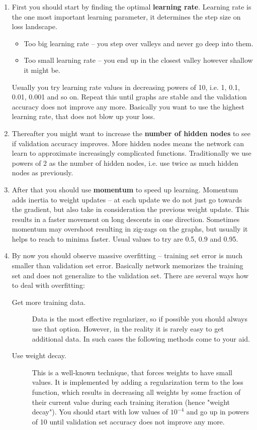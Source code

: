 \documentclass[a4paper,11pt]{article}
\begin{document}
\begin{enumerate}
	\item First you should start by finding the optimal \textbf{learning rate}. Learning rate is the one most important learning parameter, it determines the step size on loss landscape. 
	\begin{itemize}	
		\item Too big learning rate -- you step over valleys and never go deep into them. 
		\item Too small learning rate -- you end up in the closest valley however shallow it might be. 
	\end{itemize}
	Usually you try learning rate values in decreasing powers of 10, i.e. 1, 0.1, 0.01, 0.001 and so on. Repeat this until graphs are stable and the validation accuracy does not improve any more. Basically you want to use the highest learning rate, that does not blow up your loss.
	\item Thereafter you might want to increase the \textbf{number of hidden nodes} to see if validation accuracy improves. More hidden nodes means the network can learn to approximate increasingly complicated functions. Traditionally we use powers of 2 as the number of hidden nodes, i.e. use twice as much hidden nodes as previously.
	\item After that you should use \textbf{momentum} to speed up learning. Momentum adds inertia to weight updates -- at each update we do not just go towards the gradient, but also take in consideration the previous weight update. This results in a faster movement on long descents in one direction. Sometimes momentum may overshoot resulting in zig-zags on the graphs, but usually it helps to reach to minima faster. Usual values to try are 0.5, 0.9 and 0.95.
	\item By now you should observe massive overfitting -- training set error is much smaller than validation set error. Basically network memorizes the training set and does not generalize to the validation set. There are several ways how to deal with overfitting:
	\begin{description}
		\item[Get more training data.] Data is the most effective regularizer, so if possible you should always use that option. However, in the reality it is rarely easy to get additional data. In such cases the following methods come to your aid.
		\item[Use weight decay.] This is a well-known technique, that forces weights to have small values. It is implemented by adding a regularization term to the loss function, which results in decreasing all weights by some fraction of their current value during each training iteration (hence "weight decay"). You should start with low values of $10^{-4}$ and go up in powers of 10 until validation set accuracy does not improve any more.

\end{description}
\end{enumerate}
\end{document}
